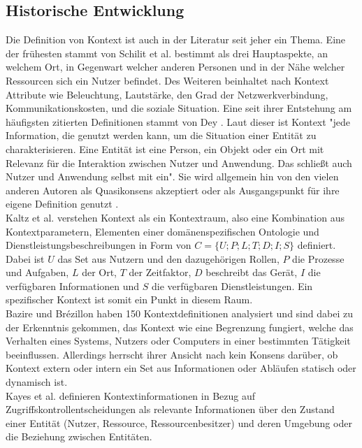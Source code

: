 \subsection{Historische Entwicklung}
Die Definition von Kontext ist auch in der Literatur seit jeher ein Thema.
Eine der frühesten stammt von Schilit et al.\cite{schilit_context-aware_1994} bestimmt als drei Hauptaspekte, an welchem Ort, in Gegenwart welcher anderen Personen und in der Nähe welcher Ressourcen sich ein Nutzer befindet. Des Weiteren beinhaltet nach \cite{schilit_context-aware_1994} Kontext Attribute wie Beleuchtung, Lautstärke, den Grad der Netzwerkverbindung, Kommunikationskosten, und die soziale Situation. Eine seit ihrer Entstehung am häufigsten zitierten Definitionen stammt von Dey \cite{dey_understanding_2001}. Laut dieser ist Kontext "jede Information, die genutzt werden kann, um die Situation einer Entität zu charakterisieren. Eine Entität ist eine Person, ein Objekt oder ein Ort mit Relevanz für die Interaktion zwischen Nutzer und Anwendung. Das schließt auch Nutzer und Anwendung selbst mit ein". Sie wird allgemein hin von den vielen anderen Autoren als Quasikonsens akzeptiert \cite{aguilar_cameonto_2018,alegre_engineering_2016,wei_liu_survey_2011} oder als Ausgangspunkt für ihre eigene Definition genutzt \cite{kayes_icaf_2012, kokinov_operational_2007}.\\
Kaltz et al. \cite{wolfgang_kaltz_context-aware_2005} verstehen Kontext als ein Kontextraum, also eine Kombination aus Kontextparametern, Elementen einer domänenspezifischen Ontologie und Dienstleistungsbeschreibungen in Form von $C = \{U;P;L;T;D;I;S\}$ definiert.
Dabei ist $U$ das Set aus Nutzern und den dazugehörigen Rollen, $P$ die Prozesse und Aufgaben,  $L$ der Ort,  $T$ der Zeitfaktor,  $D$ beschreibt das Gerät, $I$ die verfügbaren Informationen und $S$ die verfügbaren Dienstleistungen. Ein spezifischer Kontext ist somit ein Punkt in diesem Raum.\\
Bazire und Brézillon \cite{hutchison_understanding_2005} haben 150 Kontextdefinitionen analysiert und sind dabei zu der Erkenntnis gekommen, das Kontext wie eine Begrenzung fungiert, welche das Verhalten eines Systems, Nutzers oder Computers in einer bestimmten Tätigkeit beeinflussen.
Allerdings herrscht ihrer Ansicht nach kein Konsens darüber, ob Kontext extern oder intern ein Set aus Informationen oder Abläufen statisch oder dynamisch ist.\\
Kayes et al.\cite{kayes_icaf_2012} definieren Kontextinformationen in Bezug auf Zugriffskontrollentscheidungen als relevante Informationen über den Zustand einer Entität (Nutzer, Ressource, Ressourcenbesitzer) und deren Umgebung oder die Beziehung zwischen Entitäten.
